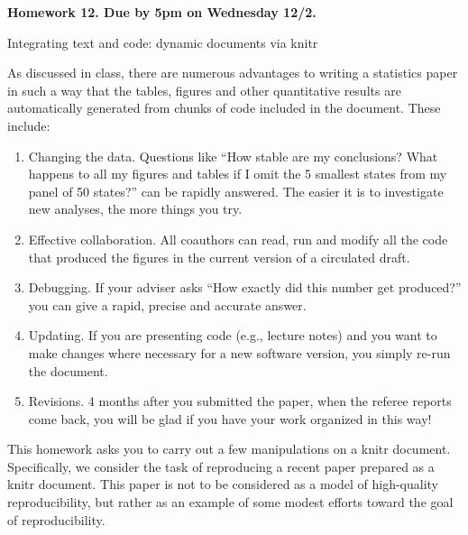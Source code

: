 \documentclass[12pt]{article}
\begin{document}
\begin{center}\bf
Homework 12. Due by 5pm on Wednesday 12/2.

Integrating text and code: dynamic documents via knitr

\end{center}

As discussed in class, there are numerous advantages to writing a statistics paper in such a way that the tables, figures and other quantitative results are automatically generated from chunks of code included in the document. These include:
\begin{enumerate}
\item Changing the data. Questions like ``How stable are my conclusions? What happens to all my figures and tables if I omit the 5 smallest states from my panel of 50 states?'' can be rapidly answered. The easier it is to investigate new analyses, the more things you try. 
\item Effective collaboration. All coauthors can read, run and modify all the code that produced the figures in the current version of a circulated draft.
\item Debugging. If your adviser asks ``How exactly did this number get produced?'' you can give a rapid, precise and accurate answer.
\item Updating. If you are presenting code (e.g., lecture notes) and you want to make changes where necessary for a new software version, you simply re-run the document.
\item Revisions. 4 months after you submitted the paper, when the referee reports come back, you will be glad if you have your work organized in this way!
\end{enumerate}
This homework asks you to carry out a few manipulations on a knitr document. Specifically, we consider the task of reproducing a recent paper prepared as a knitr document. This paper is not to be considered as a model of high-quality reproducibility, but rather as an example of some modest efforts toward the goal of reproducibility.
\end{document}
